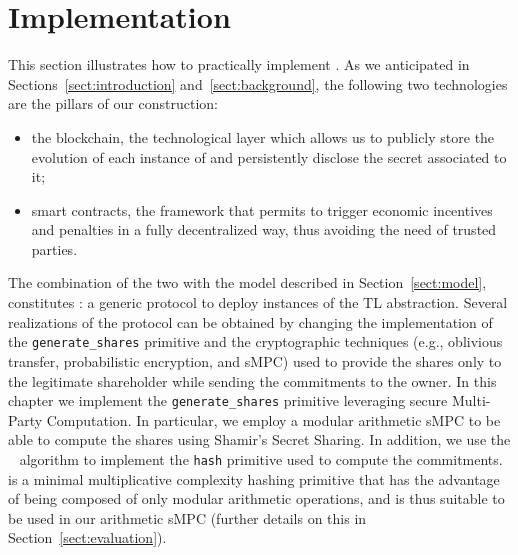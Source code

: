 \section{Implementation}\label{sect:realization}

This section illustrates how to practically implement \shortname. 
\newline
As we anticipated in Sections~\ref{sect:introduction} and~\ref{sect:background}, the following two technologies are the pillars of our construction:
\begin{itemize}
	\item the blockchain, the technological layer which allows us to publicly store the evolution of each instance of \shortname and persistently disclose the secret associated to it;
	\item smart contracts, the framework that permits to trigger economic incentives and penalties in a fully decentralized way, thus avoiding the need of trusted parties.
\end{itemize}
The combination of the two with the model described in Section~\ref{sect:model}, constitutes \shortname: a generic protocol to deploy instances of the TL abstraction.
Several realizations of the \shortname protocol can be obtained by changing the implementation of the \texttt{generate\_shares} primitive and the cryptographic techniques (e.g., oblivious transfer, probabilistic encryption, and sMPC) used to provide the shares only to the legitimate shareholder while sending the commitments to the owner.
In this chapter we implement the \texttt{generate\_shares} primitive leveraging secure Multi-Party Computation.
In particular, we employ a modular arithmetic sMPC to be able to compute the shares using Shamir's Secret Sharing.
In addition, we use the {\em \mimc}~\cite{albrecht2016mimc} algorithm to implement the \texttt{hash} primitive used to compute the commitments.
\mimc is a minimal multiplicative complexity hashing primitive that has the advantage of being composed of only modular arithmetic operations, and is thus suitable to be used in our arithmetic sMPC
(further details on this in Section~\ref{sect:evaluation}).
  
